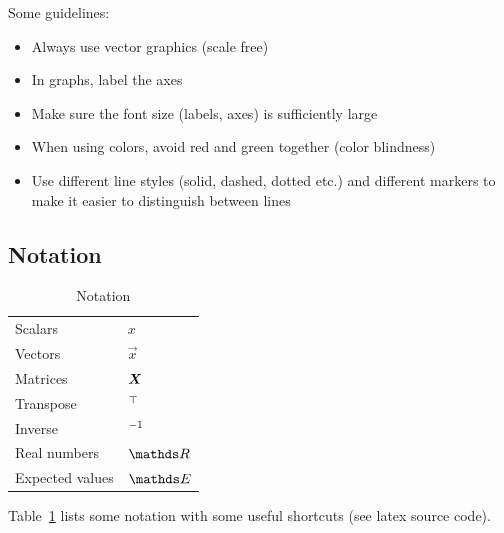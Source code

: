 \documentclass[12pt,twoside]{article}
\begin{document}
Some guidelines:
\begin{itemize}
\item Always use vector graphics (scale free)
\item In graphs, label the axes
\item Make sure the font size (labels, axes) is sufficiently large
\item When using colors, avoid red and green together (color blindness)
\item Use different line styles (solid, dashed, dotted etc.) and different markers to make it easier to distinguish between lines
\end{itemize}

\subsection{Notation}
\begin{table}[tb]
\caption{Notation}
\label{tab:notation}
\centering
\begin{tabular}{ll}
Scalars & $x$\\
Vectors & $\vec x$\\
Matrices & ${\boldsymbol{{X}}}$\\
Transpose & $^\top$\\
Inverse & $^{-1}$\\
Real numbers & $\R$\\
Expected values & $\E$\\
\end{tabular}
\end{table}
Table~\ref{tab:notation} lists some notation with some useful shortcuts (see latex source code).
\end{document}
